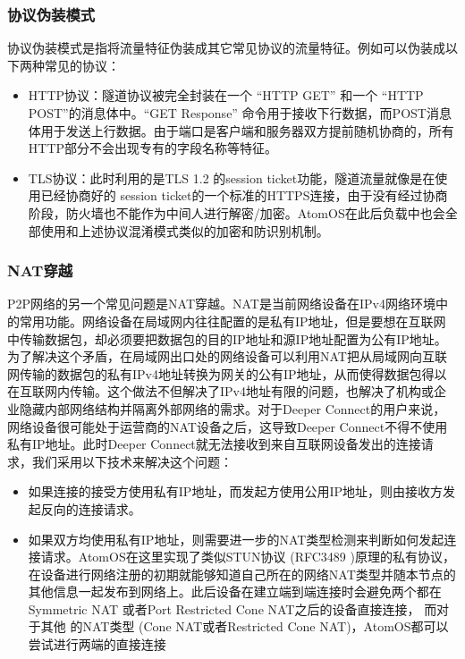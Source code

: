 \documentclass[a4paper]{article}
\begin{document}
\subsubsection{协议伪装模式}
协议伪装模式是指将流量特征伪装成其它常见协议的流量特征。例如可以伪装成以下两种常见的协议：

\begin{itemize}
\item HTTP协议：隧道协议被完全封装在一个 “HTTP GET” 和一个 “HTTP POST”的消息体中。“GET Response” 命令用于接收下行数据，而POST消息体用于发送上行数据。由于端口是客户端和服务器双方提前随机协商的，所有HTTP部分不会出现专有的字段名称等特征。

\item TLS协议：此时利用的是TLS 1.2 的session ticket功能，隧道流量就像是在使用已经协商好的 session ticket的一个标准的HTTPS连接，由于没有经过协商阶段，防火墙也不能作为中间人进行解密/加密。AtomOS在此后负载中也会全部使用和上述协议混淆模式类似的加密和防识别机制。
\end{itemize}

\subsubsection{NAT穿越}
P2P网络的另一个常见问题是NAT\cite{nat}穿越。NAT是当前网络设备在IPv4网络环境中的常用功能。网络设备在局域网内往往配置的是私有IP地址，但是要想在互联网中传输数据包，却必须要把数据包的目的IP地址和源IP地址配置为公有IP地址。为了解决这个矛盾，在局域网出口处的网络设备可以利用NAT把从局域网向互联网传输的数据包的私有IPv4地址转换为网关的公有IP地址，从而使得数据包得以在互联网内传输。这个做法不但解决了IPv4地址有限的问题，也解决了机构或企业隐藏内部网络结构并隔离外部网络的需求。对于Deeper Connect的用户来说，网络设备很可能处于运营商的NAT设备之后，这导致Deeper Connect不得不使用私有IP地址。此时Deeper Connect就无法接收到来自互联网设备发出的连接请求，我们采用以下技术来解决这个问题：
\begin{itemize}
\item 如果连接的接受方使用私有IP地址，而发起方使用公用IP地址，则由接收方发起反向的连接请求。

\item 如果双方均使用私有IP地址，则需要进一步的NAT类型检测来判断如何发起连接请求。AtomOS在这里实现了类似STUN协议 (RFC3489 \cite{rosenbergstun})原理的私有协议，在设备进行网络注册的初期就能够知道自己所在的网络NAT类型并随本节点的其他信息一起发布到网络上。此后设备在建立端到端连接时会避免两个都在Symmetric NAT 或者Port Restricted Cone NAT之后的设备直接连接， 而对于其他
的NAT类型 (Cone NAT或者Restricted Cone NAT)，AtomOS都可以尝试进行两端的直接连接
\end{itemize}
\end{document}
